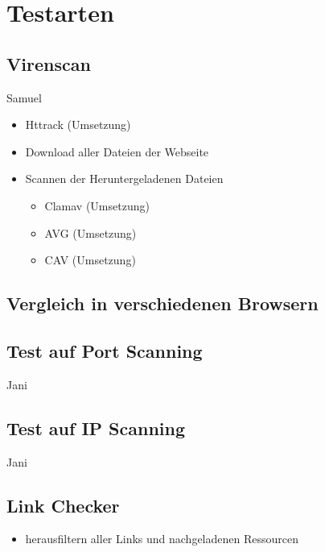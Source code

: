\section{Testarten}

\subsection{Virenscan}

\todo Samuel

\begin{itemize}
  \item Httrack (Umsetzung)
  \item Download aller Dateien der Webseite
  \item Scannen der Heruntergeladenen Dateien
  \begin{itemize}
    \item Clamav (Umsetzung)
    \item AVG (Umsetzung)
    \item CAV (Umsetzung)
  \end{itemize}
\end{itemize}

\subsection{Vergleich in verschiedenen Browsern}


\subsection{Test auf Port Scanning}

\todo Jani

\subsection{Test auf IP Scanning}

\todo Jani

\subsection{Link Checker}


\begin{itemize}
  \item herausfiltern aller Links und nachgeladenen Ressourcen
\end{itemize}

